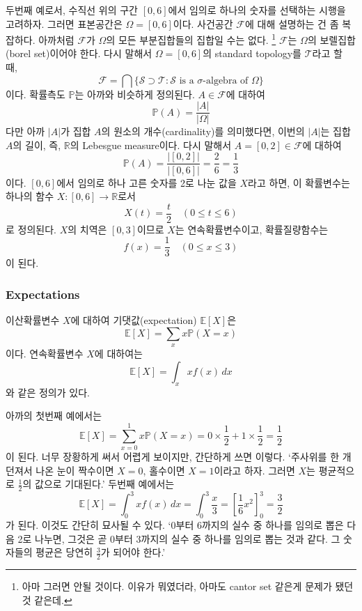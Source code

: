 \documentclass{article}
\begin{document}
두번째 예로서, 수직선 위의 구간 \([0,6]\)에서 임의로 하나의 숫자를 선택하는 시행을 고려하자.
그러면 표본공간은 \(\Omega=[0,6]\)이다.
사건공간 \(\mathcal F\)에 대해 설명하는 건 좀 복잡하다.
아까처럼 \(\mathcal F\)가 \(\Omega\)의 모든 부분집합들의 집합일 수는 없다.
\footnote{아마 그러면 안될 것이다. 이유가 뭐였더라, 아마도 cantor set 같은게 문제가 됐던 것 같은데.}
\(\mathcal F\)는 \(\Omega\)의 보렐집합(borel set)이어야 한다.
다시 말해서 \(\Omega=[0,6]\)의 standard topology를 \(\mathcal T\)라고 할 때,
\[\mathcal F=\bigcap\{\mathcal S\supset\mathcal T:\mathcal S\text{ is a \(\sigma\)-algebra of \(\Omega\)}\}\]
이다.
확률측도 \(\mathbb P\)는 아까와 비슷하게 정의된다.
\(A\in\mathcal F\)에 대하여
\[\mathbb P(A)=\frac{|A|}{|\Omega|}\]
다만 아까 \(|A|\)가  집합 \(A\)의 원소의 개수(cardinality)를 의미했다면, 이번의 \(|A|\)는 집합 \(A\)의 길이, 즉, \(\mathbb R\)의 Lebesgue measure이다.
다시 말해서 \(A=[0,2]\in\mathcal F\)에 대하여
\[\mathbb P(A)=\frac{|[0,2]|}{|[0,6]|}=\frac26=\frac13\]
이다.
\([0,6]\)에서 임의로 하나 고른 숫자를 2로 나눈 값을 \(X\)라고 하면, 이 확률변수는 하나의 함수 \(X:[0,6]\to\mathbb R\)로서
\[X(t)=\frac t2\quad(0\le t\le6)\]
로 정의된다.
\(X\)의 치역은 \([0,3]\)이므로 \(X\)는 연속확률변수이고, 확률질량함수는
\[f(x)=\frac13\quad(0\le x\le3)\]
이 된다.

%
\subsubsection{Expectations}
이산확률변수 \(X\)에 대하여 기댓값(expectation) \(\mathbb E[X]\)은
\[\mathbb E[X]=\sum_xx\mathbb P(X=x)\]
이다.
연속확률변수 \(X\)에 대하여는
\[\mathbb E[X]=\int_xxf(x)\,dx\]
와 같은 정의가 있다.

아까의 첫번째 예에서는
\[\mathbb E[X]=\sum_{x=0}^1x\mathbb P(X=x)=0\times\frac12+1\times\frac12=\frac12\]
이 된다.
너무 장황하게 써서 어렵게 보이지만, 간단하게 쓰면 이렇다.
`주사위를 한 개 던져서 나온 눈이 짝수이면 \(X=0\), 홀수이면 \(X=1\)이라고 하자.
그러면 \(X\)는 평균적으로 \(\frac12\)의 값으로 기대된다.'
두번째 예에서는
\[\mathbb E[X]=\int_0^3xf(x)\,dx=\int_0^3\frac x3=\left[\frac16x^2\right]_0^3=\frac32\]
가 된다.
이것도 간단히 묘사될 수 있다.
`0부터 6까지의 실수 중 하나를 임의로 뽑은 다음 2로 나누면, 그것은 곧 0부터 3까지의 실수 중 하나를 임의로 뽑는 것과 같다.
그 숫자들의 평균은 당연히 \(\frac32\)가 되어야 한다.'
\end{document}
